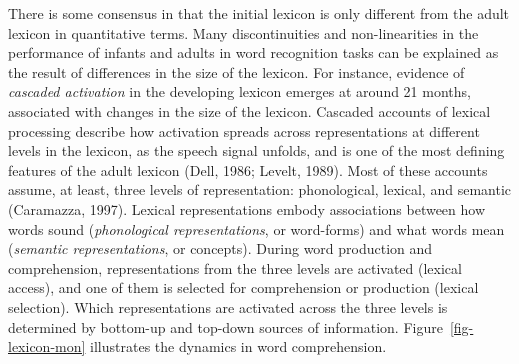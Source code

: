 \documentclass[
  12pt,
  b5paperpaper,
  twoside]{scrreprt}
\begin{document}
There is some consensus in that the initial lexicon is only different
from the adult lexicon in quantitative terms. Many discontinuities and
non-linearities in the performance of infants and adults in word
recognition tasks can be explained as the result of differences in the
size of the lexicon. For instance, evidence of \emph{cascaded
activation} in the developing lexicon emerges at around 21 months,
associated with changes in the size of the lexicon. Cascaded accounts of
lexical processing describe how activation spreads across
representations at different levels in the lexicon, as the speech signal
unfolds, and is one of the most defining features of the adult lexicon
(Dell, 1986; Levelt, 1989). Most of these accounts assume, at least,
three levels of representation: phonological, lexical, and semantic
(Caramazza, 1997). Lexical representations embody associations between
how words sound (\emph{phonological representations}, or word-forms) and
what words mean (\emph{semantic representations}, or concepts). During
word production and comprehension, representations from the three levels
are activated (lexical access), and one of them is selected for
comprehension or production (lexical selection). Which representations
are activated across the three levels is determined by bottom-up and
top-down sources of information. Figure~\ref{fig-lexicon-mon}
illustrates the dynamics in word comprehension.
\end{document}
